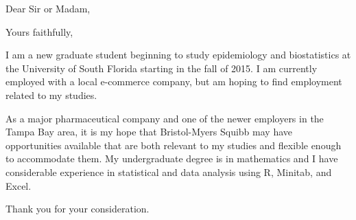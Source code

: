 \documentclass[11pt,letterpaper]{moderncv}        %
\title{}                               %
\begin{document}
\date{June 26, 2015}
\opening{Dear Sir or Madam,}
\closing{Yours faithfully,}
\makelettertitle

I am a new graduate student beginning to study epidemiology and biostatistics at the University of South Florida starting in the fall of 2015.  I am currently employed with a local e-commerce company, but am hoping to find employment related to my studies.

As a major pharmaceutical company and one of the newer employers in the Tampa Bay area, it is my hope that Bristol-Myers Squibb may have opportunities available that are both relevant to my studies and flexible enough to accommodate them.  My undergraduate degree is in mathematics and I have considerable experience in statistical and data analysis using R, Minitab, and Excel.

Thank you for your consideration.

\makeletterclosing
\end{document}
